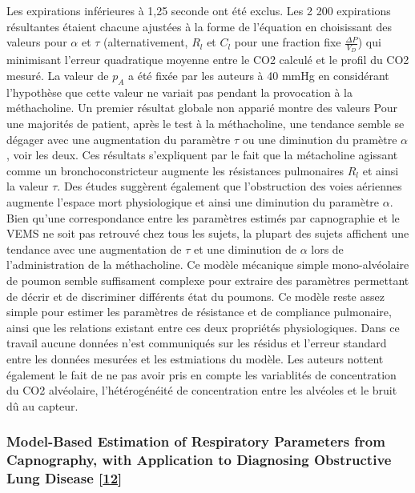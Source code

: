 \documentclass[12pt,]{article}
\begin{document}
Les expirations inférieures à 1,25 seconde ont été exclus. Les 2 200
expirations résultantes étaient chacune ajustées à la forme de
l'équation en choisissant des valeurs pour \(\alpha\) et \(\tau\)
(alternativement, \(R_{l}\) et \(C_{l}\) pour une fraction fixe
\(\frac{\Delta P}{V_{D}}\)) qui minimisant l'erreur quadratique moyenne
entre le CO2 calculé et le profil du CO2 mesuré. La valeur de \(p_{A}\)
a été fixée par les auteurs à 40 mmHg en considérant l'hypothèse que
cette valeur ne variait pas pendant la provocation à la méthacholine. Un
premier résultat globale non apparié montre des valeurs Pour une
majorités de patient, après le test à la méthacholine, une tendance
semble se dégager avec une augmentation du paramètre \(\tau\) ou une
diminution du pramètre \(\alpha\), voir les deux. Ces résultats
s'expliquent par le fait que la métacholine agissant comme un
bronchoconstricteur augmente les résistances pulmonaires \(R_{l}\) et
ainsi la valeur \(\tau\). Des études suggèrent également que
l'obstruction des voies aériennes augmente l'espace mort physiologique
et ainsi une diminution du paramètre \(\alpha\). Bien qu'une
correspondance entre les paramètres estimés par capnographie et le VEMS
ne soit pas retrouvé chez tous les sujets, la plupart des sujets
affichent une tendance avec une augmentation de \(\tau\) et une
diminution de \(\alpha\) lors de l'administration de la méthacholine. Ce
modèle mécanique simple mono-alvéolaire de poumon semble suffisament
complexe pour extraire des paramètres permettant de décrir et de
discriminer différents état du poumons. Ce modèle reste assez simple
pour estimer les paramètres de résistance et de compliance pulmonaire,
ainsi que les relations existant entre ces deux propriétés
physiologiques. Dans ce travail aucune données n'est communiqués sur les
résidus et l'erreur standard entre les données mesurées et les
estmiations du modèle. Les auteurs nottent également le fait de ne pas
avoir pris en compte les variablités de concentration du CO2 alvéolaire,
l'hétérogénéité de concentration entre les alvéoles et le bruit dû au
capteur.

\hypertarget{model-based-estimation-of-respiratory-parameters-from-capnography-with-application-to-diagnosing-obstructive-lung-disease-abid2017model}{%
\subsubsection{\texorpdfstring{Model-Based Estimation of Respiratory
Parameters from Capnography, with Application to Diagnosing Obstructive
Lung Disease
{[}\protect\hyperlink{ref-abid2017model}{12}{]}}{Model-Based Estimation of Respiratory Parameters from Capnography, with Application to Diagnosing Obstructive Lung Disease {[}12{]}}}\label{model-based-estimation-of-respiratory-parameters-from-capnography-with-application-to-diagnosing-obstructive-lung-disease-abid2017model}}
\end{document}
